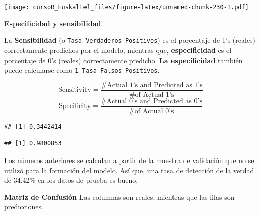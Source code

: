 \documentclass[]{book}
\newenvironment{Shaded}{\begin{snugshade}}{\end{snugshade}}
\newcommand{\KeywordTok}[1]{\textcolor[rgb]{0.13,0.29,0.53}{\textbf{#1}}}
\newcommand{\DataTypeTok}[1]{\textcolor[rgb]{0.13,0.29,0.53}{#1}}
\newcommand{\OperatorTok}[1]{\textcolor[rgb]{0.81,0.36,0.00}{\textbf{#1}}}
\newcommand{\NormalTok}[1]{#1}
\begin{document}
\texttt{[image: cursoR\_Euskaltel\_files/figure-latex/unnamed-chunk-230-1.pdf]}

\textbf{Especificidad y sensibilidad}

La \textbf{Sensibilidad} (o \texttt{Tasa\ Verdaderos\ Positivos}) es el
porcentaje de 1's (reales) correctamente predichos por el modelo,
mientras que, \textbf{especificidad} es el porcentaje de 0's (reales)
correctamente predicho. \textbf{La especificidad} también puede
calcularse como \texttt{1-Tasa\ Falsos\ Positivos}.

\[
\text{Sensitivity}=\frac{\#\text{Actual 1's and Predicted as 1's}}{\# \text{of Actual 1's}}
\] \[
\text{Specificity}=\frac{\#\text{Actual 0's and Predicted as 0's}}{\# \text{of Actual 0's}}
\]

\begin{Shaded}
\end{Shaded}

\begin{verbatim}
## [1] 0.3442414
\end{verbatim}

\begin{Shaded}
\end{Shaded}

\begin{verbatim}
## [1] 0.9800853
\end{verbatim}

Los números anteriores se calculan a partir de la muestra de validación
que no se utilizó para la formación del modelo. Así que, una tasa de
detección de la verdad de 34.42\% en los datos de prueba es bueno.

\textbf{Matriz de Confusión} Las columnas son reales, mientras que las
filas son predicciones.

\begin{Shaded}
\end{Shaded}
\end{document}
